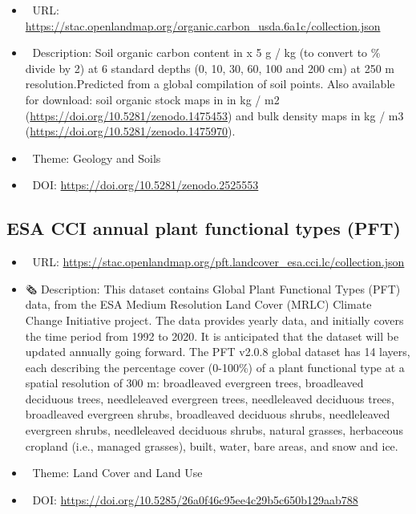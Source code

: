 \documentclass[
  graybox,natbib,nospthms]{svmono}
\providecommand{\tightlist}{%
  \setlength{\itemsep}{0pt}\setlength{\parskip}{0pt}}
\providecommand{\tightlist}{\setlength{\itemsep}{0pt}\setlength{\parskip}{0pt}}
\begin{document}
\begin{itemize}
\tightlist
\item
  🔗 URL: \url{https://stac.openlandmap.org/organic.carbon_usda.6a1c/collection.json}
\item
  📰 Description: Soil organic carbon content in x 5 g / kg (to convert to \% divide by 2) at 6 standard depths (0, 10, 30, 60, 100 and 200 cm) at 250 m resolution.Predicted from a global compilation of soil points. Also available for download: soil organic stock maps in in kg / m2 (\url{https://doi.org/10.5281/zenodo.1475453}) and bulk density maps in kg / m3 (\url{https://doi.org/10.5281/zenodo.1475970}).
\item
  📝 Theme: Geology and Soils
\item
  📂 DOI: \url{https://doi.org/10.5281/zenodo.2525553}
\end{itemize}

\hypertarget{esa-cci-annual-plant-functional-types-pft}{%
\subsection{ESA CCI annual plant functional types (PFT)}\label{esa-cci-annual-plant-functional-types-pft}}

\begin{itemize}
\tightlist
\item
  🔗 URL: \url{https://stac.openlandmap.org/pft.landcover_esa.cci.lc/collection.json}
\item
  🗞 Description: This dataset contains Global Plant Functional Types (PFT) data, from the ESA Medium Resolution Land Cover (MRLC) Climate Change Initiative project. The data provides yearly data, and initially covers the time period from 1992 to 2020. It is anticipated that the dataset will be updated annually going forward. The PFT v2.0.8 global dataset has 14 layers, each describing the percentage cover (0-100\%) of a plant functional type at a spatial resolution of 300 m: broadleaved evergreen trees, broadleaved deciduous trees, needleleaved evergreen trees, needleleaved deciduous trees, broadleaved evergreen shrubs, broadleaved deciduous shrubs, needleleaved evergreen shrubs, needleleaved deciduous shrubs, natural grasses, herbaceous cropland (i.e., managed grasses), built, water, bare areas, and snow and ice.
\item
  📝 Theme: Land Cover and Land Use
\item
  📂 DOI: \url{https://doi.org/10.5285/26a0f46c95ee4c29b5c650b129aab788}
\end{itemize}
\end{document}
